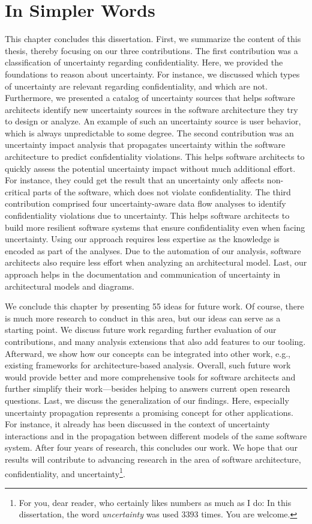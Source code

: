 \section{In Simpler Words}%
\label{sec:conclusion:simple}

This chapter concludes this dissertation.
First, we summarize the content of this thesis, thereby focusing on our three contributions.
The first contribution was a classification of uncertainty regarding confidentiality.
Here, we provided the foundations to reason about uncertainty.
For instance, we discussed which types of uncertainty are relevant regarding confidentiality, and which are not.
Furthermore, we presented a catalog of uncertainty sources that helps software architects identify new uncertainty sources in the software architecture they try to design or analyze.
An example of such an uncertainty source is user behavior, which is always unpredictable to some degree.
The second contribution was an uncertainty impact analysis that propagates uncertainty within the software architecture to predict confidentiality violations.
This helps software architects to quickly assess the potential uncertainty impact without much additional effort.
For instance, they could get the result that an uncertainty only affects non-critical parts of the software, which does not violate confidentiality.
The third contribution comprised four uncertainty-aware data flow analyses to identify confidentiality violations due to uncertainty.
This helps software architects to build more resilient software systems that ensure confidentiality even when facing uncertainty.
Using our approach requires less expertise as the knowledge is encoded as part of the analyses.
Due to the automation of our analysis, software architects also require less effort when analyzing an architectural model.
Last, our approach helps in the documentation and communication of uncertainty in architectural models and diagrams.

We conclude this chapter by presenting 55 ideas for future work.
Of course, there is much more research to conduct in this area, but our ideas can serve as a starting point.
We discuss future work regarding further evaluation of our contributions, and many analysis extensions that also add features to our tooling.
Afterward, we show how our concepts can be integrated into other work, e.g., existing frameworks for architecture-based analysis.
Overall, such future work would provide better and more comprehensive tools for software architects and further simplify their work---besides helping to answers current open research questions.
Last, we discuss the generalization of our findings.
Here, especially uncertainty propagation represents a promising concept for other applications.
For instance, it already has been discussed in the context of uncertainty interactions and in the propagation between different models of the same software system.
After four years of research, this concludes our work.
We hope that our results will contribute to advancing research in the area of software architecture, confidentiality, and uncertainty\footnote{For you, dear reader, who certainly likes numbers as much as I do: In this dissertation, the word \emph{uncertainty} was used 3393 times. You are welcome.}.
